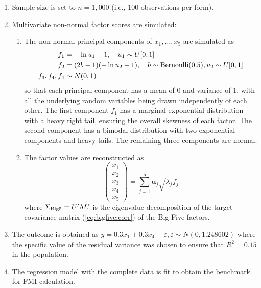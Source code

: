 \documentclass[11pt]{asaproc}
\begin{document}
\begin{enumerate}
    \item Sample size is set to $n=1,000$ (i.e., $100$ observations per form).
    \item Multivariate non-normal factor scores are simulated:
    \begin{enumerate}
        \item The non-normal principal components of $x_1, \ldots, x_5$ are simulated as
            \begin{align}
                f_1 & = -\ln u_1-1, \quad u_1 \sim U[0,1] \\
                f_2 & = (2 b-1) (-\ln u_2-1), \quad b \sim {\rm Bernoulli}(0.5), u_2 \sim U[0,1] \\
                f_3, f_4, f_4 & \sim N(0,1)
            \end{align}
            so that each principal component has a mean of 0 and variance of 1,
            with all the underlying random variables being drawn independently of each other.
            The first component $f_1$ has a marginal exponential distribution with a heavy right tail,
            ensuring the overall skewness of each factor. The second component has a bimodal distribution
            with two exponential components and heavy tails. The remaining three components are normal.
        \item The factor values are reconstructed as
            \begin{equation}
                \begin{pmatrix}
                    x_1 \\ x_2 \\ x_3 \\ x_4 \\ x_5
                \end{pmatrix}
                =
                \sum_{j=1}^5 \mathbf{u}_j \sqrt{\lambda_j} f_j
                \label{eq:Sigma:big5:eigenproblem}
            \end{equation}
            where $\Sigma_{\rm Big 5} = U' \Lambda U$ is the eigenvalue decomposition of the target
            covariance matrix (\ref{eq:bigfive:corr}) of the Big Five factors.
    \end{enumerate}
        \item The outcome is obtained as $y=0.3x_1 + 0.3x_4 + \varepsilon, \varepsilon \sim N(0,1.248602)$
            where the specific value of the residual variance was chosen to ensure that $R^2=0.15$ in the population.
        \item The regression model with the complete data is fit to obtain the benchmark for FMI calculation.

\end{enumerate}
\end{document}
